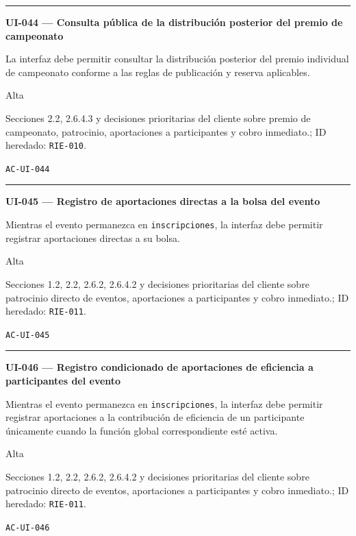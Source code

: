 \documentclass[10pt,letterpaper]{article}
\begin{document}
\vspace{0.25em}\hrule\vspace{0.65em}
\noindent\textbf{UI-044 --- Consulta pública de la distribución posterior del premio de campeonato}\par
\begin{description}[style=nextline,leftmargin=3.15cm,labelwidth=2.8cm,font=\normalfont\bfseries]
\item[Obligación] La interfaz debe permitir consultar la distribución posterior del premio individual de campeonato conforme a las reglas de publicación y reserva aplicables.
\item[Prioridad] Alta
\item[Procedencia] Secciones 2.2, 2.6.4.3 y decisiones prioritarias del cliente sobre premio de campeonato, patrocinio, aportaciones a participantes y cobro inmediato.; ID heredado: \texttt{RIE-010}.
\item[Verificación] \texttt{AC-UI-044}
\end{description}
\vspace{0.25em}\hrule\vspace{0.65em}
\noindent\textbf{UI-045 --- Registro de aportaciones directas a la bolsa del evento}\par
\begin{description}[style=nextline,leftmargin=3.15cm,labelwidth=2.8cm,font=\normalfont\bfseries]
\item[Obligación] Mientras el evento permanezca en \texttt{inscripciones}, la interfaz debe permitir registrar aportaciones directas a su bolsa.
\item[Prioridad] Alta
\item[Procedencia] Secciones 1.2, 2.2, 2.6.2, 2.6.4.2 y decisiones prioritarias del cliente sobre patrocinio directo de eventos, aportaciones a participantes y cobro inmediato.; ID heredado: \texttt{RIE-011}.
\item[Verificación] \texttt{AC-UI-045}
\end{description}
\vspace{0.25em}\hrule\vspace{0.65em}
\noindent\textbf{UI-046 --- Registro condicionado de aportaciones de eficiencia a participantes del evento}\par
\begin{description}[style=nextline,leftmargin=3.15cm,labelwidth=2.8cm,font=\normalfont\bfseries]
\item[Obligación] Mientras el evento permanezca en \texttt{inscripciones}, la interfaz debe permitir registrar aportaciones a la contribución de eficiencia de un participante únicamente cuando la función global correspondiente esté activa.
\item[Prioridad] Alta
\item[Procedencia] Secciones 1.2, 2.2, 2.6.2, 2.6.4.2 y decisiones prioritarias del cliente sobre patrocinio directo de eventos, aportaciones a participantes y cobro inmediato.; ID heredado: \texttt{RIE-011}.
\item[Verificación] \texttt{AC-UI-046}
\end{description}
\end{document}
